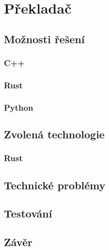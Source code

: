 \chapter{Překladač}

\blind[1]

\section{Možnosti řešení}

\blind[1]

\subsection{C++}

\blind[3]

\subsection{Rust}

\blind[3]

\subsection{Python}

\blind[2]

\section{Zvolená technologie}

\subsection{Rust}

\blind[2]

\section{Technické problémy}

\blind[4]

\section{Testování}

\blind[2]

\section{Závěr}

\blind[1]